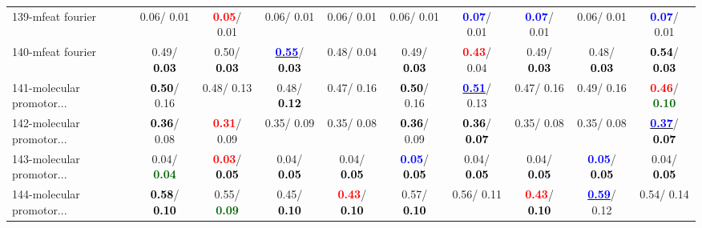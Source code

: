 \begin{table}[h]
\begin{center}
{\begin{tabular}{lc|c|c|c|c|c|c|c|c}
139-mfeat fourier &   0.06/  0.01 & \textcolor{red}{\textbf{  0.05}}/  0.01 &   0.06/  0.01 &   0.06/  0.01 &   0.06/  0.01 & \textcolor{blue}{\textbf{  0.07}}/  0.01 & \textcolor{blue}{\textbf{  0.07}}/  0.01 &   0.06/  0.01 & \textcolor{blue}{\textbf{  0.07}}/  0.01 \\
140-mfeat fourier &   0.49/\textcolor{black}{\textbf{  0.03}} &   0.50/\textcolor{black}{\textbf{  0.03}} & \underline{\textcolor{blue}{\textbf{  0.55}}}/\textcolor{black}{\textbf{  0.03}} &   0.48/  0.04 &   0.49/\textcolor{black}{\textbf{  0.03}} & \textcolor{red}{\textbf{  0.43}}/  0.04 &   0.49/\textcolor{black}{\textbf{  0.03}} &   0.48/\textcolor{black}{\textbf{  0.03}} & \textcolor{black}{\textbf{  0.54}}/\textcolor{black}{\textbf{  0.03}} \\
141-molecular promotor... & \textcolor{black}{\textbf{  0.50}}/  0.16 &   0.48/  0.13 &   0.48/\textcolor{black}{\textbf{  0.12}} &   0.47/  0.16 & \textcolor{black}{\textbf{  0.50}}/  0.16 & \underline{\textcolor{blue}{\textbf{  0.51}}}/  0.13 &   0.47/  0.16 &   0.49/  0.16 & \textcolor{red}{\textbf{  0.46}}/\textcolor{darkgreen}{\textbf{  0.10}} \\
142-molecular promotor... & \textcolor{black}{\textbf{  0.36}}/  0.08 & \textcolor{red}{\textbf{  0.31}}/  0.09 &   0.35/  0.09 &   0.35/  0.08 & \textcolor{black}{\textbf{  0.36}}/  0.09 & \textcolor{black}{\textbf{  0.36}}/\textcolor{black}{\textbf{  0.07}} &   0.35/  0.08 &   0.35/  0.08 & \underline{\textcolor{blue}{\textbf{  0.37}}}/\textcolor{black}{\textbf{  0.07}} \\ \hline
143-molecular promotor... &   0.04/\textcolor{darkgreen}{\textbf{  0.04}} & \textcolor{red}{\textbf{  0.03}}/\textcolor{black}{\textbf{  0.05}} &   0.04/\textcolor{black}{\textbf{  0.05}} &   0.04/\textcolor{black}{\textbf{  0.05}} & \textcolor{blue}{\textbf{  0.05}}/\textcolor{black}{\textbf{  0.05}} &   0.04/\textcolor{black}{\textbf{  0.05}} &   0.04/\textcolor{black}{\textbf{  0.05}} & \textcolor{blue}{\textbf{  0.05}}/\textcolor{black}{\textbf{  0.05}} &   0.04/\textcolor{black}{\textbf{  0.05}} \\
144-molecular promotor... & \textcolor{black}{\textbf{  0.58}}/\textcolor{black}{\textbf{  0.10}} &   0.55/\textcolor{darkgreen}{\textbf{  0.09}} &   0.45/\textcolor{black}{\textbf{  0.10}} & \textcolor{red}{\textbf{  0.43}}/\textcolor{black}{\textbf{  0.10}} &   0.57/\textcolor{black}{\textbf{  0.10}} &   0.56/  0.11 & \textcolor{red}{\textbf{  0.43}}/\textcolor{black}{\textbf{  0.10}} & \underline{\textcolor{blue}{\textbf{  0.59}}}/  0.12 &   0.54/  0.14 \\

\end{tabular}}
\end{center}
\end{table}
